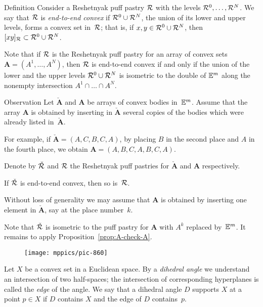 \begin{thm}{Definition}
Consider a Reshetnyak puff pastry $\mathcal{R}$ with the levels 
$\mathcal{R}^0,\dots,\mathcal{R}^N$.
We say that $\mathcal{R}$ is \emph{end-to-end convex} 
if $\mathcal{R}^0\cup\mathcal{R}^N$, the union of its lower and upper levels, 
forms a convex set in~$\mathcal{R}$;
that is, if $x,y\in \mathcal{R}^0\cup\mathcal{R}^N$, then $[xy]_{\mathcal{R}}\subset  \mathcal{R}^0\cup\mathcal{R}^N$.
\end{thm}

Note that if $\mathcal{R}$ is the Reshetnyak puff pastry for an array of convex sets $\bm{A}=(A^{1},\dots, A^{N})$, 
then $\mathcal{R}$ is end-to-end convex
if and only if the union of the lower and the upper levels
$\mathcal{R}^0\cup\mathcal{R}^N$ is isometric to the double of $\mathbb{E}^m$ along the nonempty intersection $A^1\cap\dots\cap A^N$.


\begin{thm}{Observation}\label{obs:end-to-end-convex}
Let $\check{\bm{A}}$ and $\bm{A}$ be arrays of convex bodies in~$\mathbb{E}^m$.
Assume that
the  array $\bm{A}$ is
obtained by inserting in $\check{\bm{A}}$ 
several copies of the bodies which were already listed in~$\check{\bm{A}}$.

For example, if $\check{\bm{A}}=(A,C,B,C,A)$, by placing $B$ in the second place and $A$ in the fourth place, we obtain $\bm{A}=(A,B,C,A,B,C,A)$.

Denote by $\check{\mathcal{R}}$ and $\mathcal{R}$ 
the Reshetnyak puff pastries for $\check{\bm{A}}$ and $\bm{A}$ respectively.

If $\check{\mathcal{R}}$ is end-to-end convex, then so is~$\mathcal{R}$.
\end{thm}

Without loss of generality we may assume that $\bm{A}$ is 
obtained by inserting one element in $\check{\bm{A}}$,
say at the place number~$k$.

Note that $\check{\mathcal{R}}$ is isometric to the puff pastry 
for $\bm{A}$ with $A^k$ replaced by~$\mathbb{E}^m$.
It remains to apply Proposition~\ref{prop:A-check-A}.
\qeds

{

\begin{wrapfigure}{o}{30mm}
\vskip-4mm
\centering
\texttt{[image: mppics/pic-860]}
\end{wrapfigure}

Let $X$ be a convex set in a Euclidean space.
By a \emph{dihedral angle} we understand an intersection of two half-spaces;
the intersection of corresponding hyperplanes is called the {}\emph{edge} of the angle.
We say that a dihedral angle $D$ 
supports
 $X$ at a point $p\in X$ 
if $D$ contains $X$ and the edge of $D$ contains~$p$.

}

